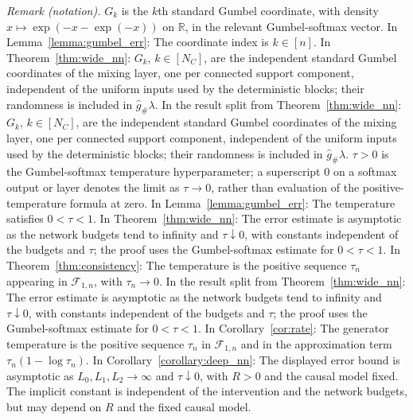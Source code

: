 \noindent\textit{Remark (notation).} $G_k$ is the $k$th standard Gumbel coordinate, with density $x\mapsto\exp(-x-\exp(-x))$ on $\mathbb{R}$, in the relevant Gumbel-softmax vector. In Lemma~\ref{lemma:gumbel_err}: The coordinate index is $k\in[n]$. In Theorem~\ref{thm:wide_nn}: $G_k$, $k\in[N_C]$, are the independent standard Gumbel coordinates of the mixing layer, one per connected support component, independent of the uniform inputs used by the deterministic blocks; their randomness is included in $\hat g_{\#}\lambda$. In the result split from Theorem~\ref{thm:wide_nn}: $G_k$, $k\in[N_C]$, are the independent standard Gumbel coordinates of the mixing layer, one per connected support component, independent of the uniform inputs used by the deterministic blocks; their randomness is included in $\hat g_{\#}\lambda$. $\tau>0$ is the Gumbel-softmax temperature hyperparameter; a superscript $0$ on a softmax output or layer denotes the limit as $\tau\rightarrow0$, rather than evaluation of the positive-temperature formula at zero. In Lemma~\ref{lemma:gumbel_err}: The temperature satisfies $0<\tau<1$. In Theorem~\ref{thm:wide_nn}: The error estimate is asymptotic as the network budgets tend to infinity and $\tau\downarrow0$, with constants independent of the budgets and $\tau$; the proof uses the Gumbel-softmax estimate for $0<\tau<1$. In Theorem~\ref{thm:consistency}: The temperature is the positive sequence $\tau_n$ appearing in $\mathcal{F}_{1,n}$, with $\tau_n\rightarrow0$. In the result split from Theorem~\ref{thm:wide_nn}: The error estimate is asymptotic as the network budgets tend to infinity and $\tau\downarrow0$, with constants independent of the budgets and $\tau$; the proof uses the Gumbel-softmax estimate for $0<\tau<1$. In Corollary~\ref{cor:rate}: The generator temperature is the positive sequence $\tau_n$ in $\mathcal F_{1,n}$ and in the approximation term $\tau_n(1-\log\tau_n)$. In Corollary~\ref{corollary:deep_nn}: The displayed error bound is asymptotic as $L_0,L_1,L_2\to\infty$ and $\tau\downarrow0$, with $R>0$ and the causal model fixed. The implicit constant is independent of the intervention and the network budgets, but may depend on $R$ and the fixed causal model.


